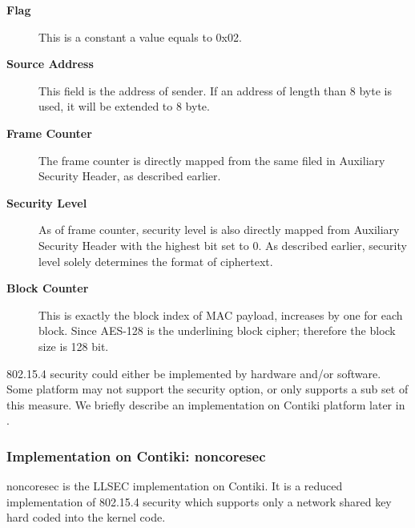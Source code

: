 \begin{description}
\item[\textbf{Flag}]
This is a constant a value equals to 0x02.
\item[\textbf{Source Address}]
This field is the address of sender. If an address of length than 8 byte is used, it will be extended to 8 byte.
\item[\textbf{Frame Counter}]
The frame counter is directly mapped from the same filed in Auxiliary Security Header, as described earlier.
\item[\textbf{Security Level}]
As of frame counter, security level is also directly mapped from Auxiliary Security Header with the highest bit set to $0$. As described earlier, security level solely determines the format of ciphertext.
\item[\textbf{Block Counter}]
This is exactly the block index of MAC payload, increases by one for each block. Since AES-128 is the underlining block cipher; therefore the block size is 128 bit.
\end{description}

802.15.4 security could either be implemented by hardware and/or software. Some platform may not support the security option, or only supports a sub set of this measure. We briefly describe an implementation on Contiki platform later in .

\subsubsection{Implementation on Contiki: noncoresec} \label{Subsec: noncoresec}
noncoresec is the LLSEC implementation on Contiki. It is a reduced implementation of 802.15.4 security which supports only a network shared key hard coded into the kernel code.

